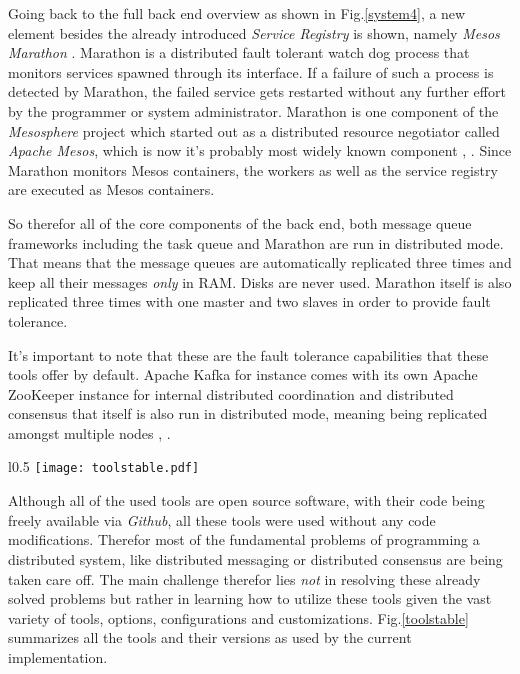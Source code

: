 Going back to the full back end overview as shown in Fig.\ref{system4},
a new element besides the already introduced \textit{Service Registry}
is shown, namely \textit{Mesos Marathon} \cite{marathon}.
Marathon is a distributed
fault tolerant watch dog process that monitors services spawned
through its interface. If a failure of such a process is detected
by Marathon, the failed service gets restarted without any further
effort by the programmer or system administrator. Marathon is one
component of the \textit{Mesosphere} project which started out
as a distributed resource negotiator called \textit{Apache Mesos},
which is now it's probably most widely known component
\cite{mesosphere}, \cite{mesos}. Since Marathon monitors
Mesos containers, the workers as well as the service registry are
executed as Mesos containers.
\newline

So therefor all of the core components of the back end, both message
queue frameworks including the task queue and Marathon are run in
distributed mode. That means that the message queues are automatically
replicated three times and keep all their messages \textit{only} in RAM.
Disks are never used. Marathon itself is also replicated three times
with one master and two slaves in order to provide fault tolerance.

It's important to note that these are the fault tolerance capabilities
that these tools offer by default. Apache Kafka for instance comes
with its own Apache ZooKeeper instance for internal distributed
coordination and distributed consensus that itself is also run in
distributed mode, meaning being replicated amongst multiple nodes
\cite{zk}, \cite{zkpaper}.

\begin{wrapfigure}{l}{0.5\textwidth}
  \texttt{[image: toolstable.pdf]}
  \caption{Overview over the tools and their versions as used
           in the current implementation.}
  \label{toolstable}
  \vspace{-10pt}
\end{wrapfigure}

Although all of the used tools are open source software, with their
code being freely available via \textit{Github}, all these tools were
used without any code modifications. Therefor most of the fundamental
problems of programming a distributed system, like distributed
messaging or distributed consensus are being taken care off.
The main challenge therefor lies \textit{not} in resolving these
already solved problems but rather in learning how to utilize
these tools given the vast variety of tools, options, configurations
and customizations.
Fig.\ref{toolstable} summarizes all the tools and their versions
as used by the current implementation.


